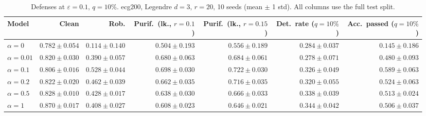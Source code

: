 \begin{table}[htbp]
  \centering
  \small
  \begin{tabular}{@{}lrrrrrr@{}}
    \toprule
    Model & Clean & Rob. & Purif.\ (lk., $r{=}0.1$) & Purif.\ (lk., $r{=}0.15$) & Det.\ rate ($q{=}10\%$) & Acc.\ passed ($q{=}10\%$) \\
    \midrule
    $\alpha{=}0$ & $0.782 \pm 0.054$ & $0.114 \pm 0.140$ & $0.504 \pm 0.193$ & $0.556 \pm 0.189$ & $0.284 \pm 0.037$ & $0.145 \pm 0.186$ \\
    $\alpha{=}0.01$ & $0.820 \pm 0.030$ & $0.390 \pm 0.057$ & $0.680 \pm 0.063$ & $0.684 \pm 0.061$ & $0.278 \pm 0.071$ & $0.480 \pm 0.093$ \\
    $\alpha{=}0.1$ & $0.806 \pm 0.016$ & $\mathbf{0.528 \pm 0.044}$ & $\mathbf{0.698 \pm 0.030}$ & $\mathbf{0.722 \pm 0.030}$ & $0.326 \pm 0.049$ & $\mathbf{0.589 \pm 0.063}$ \\
    $\alpha{=}0.2$ & $0.822 \pm 0.020$ & $0.462 \pm 0.039$ & $0.662 \pm 0.035$ & $0.716 \pm 0.035$ & $0.320 \pm 0.055$ & $0.524 \pm 0.063$ \\
    $\alpha{=}0.5$ & $0.828 \pm 0.010$ & $0.428 \pm 0.017$ & $0.638 \pm 0.030$ & $0.666 \pm 0.033$ & $0.338 \pm 0.039$ & $0.513 \pm 0.024$ \\
    $\alpha{=}1$ & $\mathbf{0.870 \pm 0.017}$ & $0.408 \pm 0.027$ & $0.608 \pm 0.023$ & $0.646 \pm 0.021$ & $\mathbf{0.344 \pm 0.042}$ & $0.506 \pm 0.037$ \\
    \bottomrule
  \end{tabular}
  \caption{Defenses at $\varepsilon=0.1$, $q{=}10\%$. ecg200, Legendre $d{=}3$, $r{=}20$, 10 seeds (mean $\pm$ 1 std). All columns use the full test split.}
  \label{tab:ecg200_models_r20_eps0.1}
\end{table}
